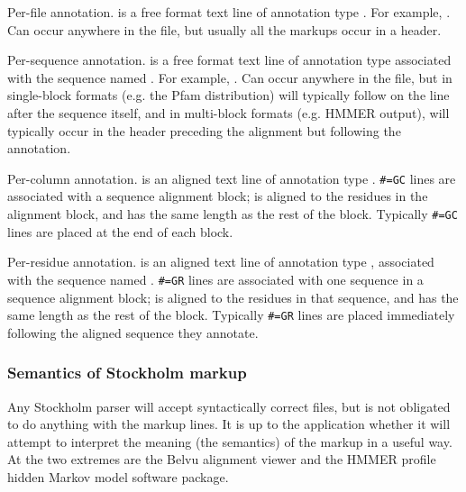 \begin{sreitems}{}
\item [\emprog{\#=GF <tag> <s>}]
	Per-file annotation.  is a free format text line
	of annotation type . For example, . Can occur anywhere in the file, but usually
	all the  markups occur in a header.

\item [\emprog{\#=GS <seqname> <tag> <s>}]
	Per-sequence annotation.  is a free format text line
	of annotation type  associated with the sequence
	named . For example, . Can occur anywhere
	in the file, but in single-block formats (e.g. the Pfam
	distribution) will typically follow on the line after the
	sequence itself, and in multi-block formats (e.g. HMMER
	output), will typically occur in the header preceding the
	alignment but following the  annotation.

\item [\emprog{\#=GC <tag> <s>}]
	Per-column annotation.  is an aligned text line
	of annotation type .
        \verb+#=GC+ lines are
	associated with a sequence alignment block; 
	is aligned to the residues in the alignment block, and has
	the same length as the rest of the block.
	Typically \verb+#=GC+ lines are placed at the end of each block.

\item [\emprog{\#=GR <seqname> <tag> <s>}]
	Per-residue annotation.  is an aligned text line
	of annotation type , associated with the sequence
	named . 
	\verb+#=GR+ lines are 
	associated with one sequence in a sequence alignment block; 
	is aligned to the residues in that sequence, and has
	the same length as the rest of the block.
	Typically
        \verb+#=GR+ lines are placed immediately following the
	aligned	sequence they annotate.
\end{sreitems}

\subsubsection{Semantics of Stockholm markup}

Any Stockholm parser will accept syntactically correct files, but is
not obligated to do anything with the markup lines. It is up to the
application whether it will attempt to interpret the meaning (the
semantics) of the markup in a useful way. At the two extremes are the
Belvu alignment viewer and the HMMER profile hidden Markov model
software package.

